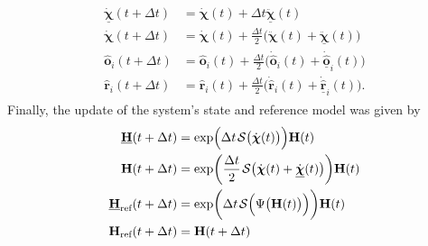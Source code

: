 \begin{align}
    \begin{split}
        \underline{\dot{\boldsymbol{\chi}}}(t + \Delta t) &= \dot{\boldsymbol{\chi}}(t) + \Delta t \ddot{\underline{\boldsymbol{\chi}}}(t)\\
        \dot{\boldsymbol{\chi}}(t + \Delta t) &= \dot{\boldsymbol{\chi}}(t) + \frac{\Delta t}{2} \bigl(\ddot{\boldsymbol{\chi}}(t) + \underline{\ddot{\boldsymbol{\chi}}}(t)\bigr)\\
        \widehat{\mathbf{o}}_i(t + \Delta t) &= \widehat{\mathbf{o}}_i(t) + \frac{\Delta t}{2} \bigl(\dot{\widehat{\mathbf{o}}}_i(t) + \underline{\dot{\widehat{\mathbf{o}}}}_i(t)\bigr)\\
        \widehat{\mathbf{r}}_i(t + \Delta t) &= \widehat{\mathbf{r}}_i(t) + \frac{\Delta t}{2} \bigl(\dot{\widehat{\mathbf{r}}}_i(t) + \underline{\dot{\widehat{\mathbf{r}}}}_i(t)\bigr).
    \end{split}
\end{align}
Finally, the update of the system's state and reference model was given by
\begin{align}
    \begin{split}
        \underline{\mathbf{H}}(t +\Delta t) &= \exp\Bigl(\Delta t\SL\bigl(\dot{\boldsymbol{\chi}}(t)\bigr)\Bigr)\mathbf{H}(t)\\
        \mathbf{H}(t + \Delta t) &= \exp\biggl(\frac{\Delta t}{2}\SL[\dot{\boldsymbol{\chi}}(t) + \underline{\dot{\boldsymbol{\chi}}}(t)]\biggr)\mathbf{H}(t)\\
        \underline{\mathbf{H}}_\text{ref}(t +\Delta t) &= \exp\biggl(\Delta t\SL\Bigl(\Psi\bigl(\mathbf{H}(t)\bigr)\Bigr)\biggr)\mathbf{H}(t)\\
        \mathbf{H}_\text{ref} (t + \Delta t) &= \mathbf{H}(t + \Delta t)
    \end{split}
\end{align}

